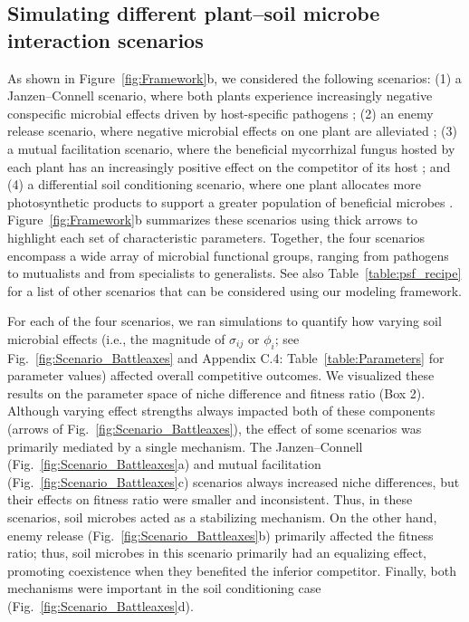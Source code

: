 \subsection{Simulating different plant--soil microbe interaction scenarios}
As shown in Figure~\ref{fig:Framework}b, we considered the following scenarios: (1) a Janzen--Connell scenario, where both plants experience increasingly negative conspecific microbial effects driven by host-specific pathogens \citep{Janzen1970, Connell1971}; (2) an enemy release scenario, where negative microbial effects on one plant are alleviated \citep{Keane2002, Reinhart2006}; (3) a mutual facilitation scenario, where the beneficial mycorrhizal fungus hosted by each plant has an increasingly positive effect on the competitor of its host \citep{Bever2002}; and (4) a differential soil conditioning scenario, where one plant allocates more photosynthetic products to support a greater population of beneficial microbes \citep{Zheng2015, Norby1987}. Figure~\ref{fig:Framework}b summarizes these scenarios using thick arrows to highlight each set of characteristic parameters. Together, the four scenarios encompass a wide array of microbial functional groups, ranging from pathogens to mutualists and from specialists to generalists. See also Table~\ref{table:psf_recipe} for a list of other scenarios that can be considered using our modeling framework.
\par


For each of the four scenarios, we ran simulations to quantify how varying soil microbial effects (i.e., the magnitude of $\sigma_{ij}$ or $\phi_{i}$; see Fig.~\ref{fig:Scenario_Battleaxes} and Appendix C.4: Table~\ref{table:Parameters} for parameter values) affected overall competitive outcomes.
We visualized these results on the parameter space of niche difference and fitness ratio (Box 2). Although varying effect strengths always impacted both of these components (arrows of Fig.~\ref{fig:Scenario_Battleaxes}), the effect of some scenarios was primarily mediated by a single mechanism.
The Janzen--Connell (Fig.~\ref{fig:Scenario_Battleaxes}a) and mutual facilitation (Fig.~\ref{fig:Scenario_Battleaxes}c) scenarios always increased niche differences, but their effects on fitness ratio were smaller and inconsistent. Thus, in these scenarios, soil microbes acted as a stabilizing mechanism. On the other hand, enemy release (Fig.~\ref{fig:Scenario_Battleaxes}b) primarily affected the fitness ratio; thus, soil microbes in this scenario primarily had an equalizing effect, promoting coexistence when they benefited the inferior competitor. Finally, both mechanisms were important in the soil conditioning case (Fig.~\ref{fig:Scenario_Battleaxes}d).
\par


